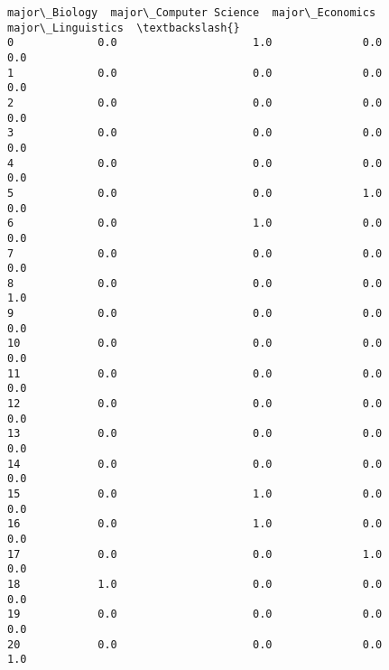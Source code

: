 \documentclass[11pt]{article}
\begin{document}
\begin{tcolorbox}[breakable, size=fbox, boxrule=.5pt, pad at break*=1mm, opacityfill=0]
\begin{Verbatim}[commandchars=\\\{\}]
    major\_Biology  major\_Computer Science  major\_Economics  major\_Linguistics  \textbackslash{}
0             0.0                     1.0              0.0                0.0
1             0.0                     0.0              0.0                0.0
2             0.0                     0.0              0.0                0.0
3             0.0                     0.0              0.0                0.0
4             0.0                     0.0              0.0                0.0
5             0.0                     0.0              1.0                0.0
6             0.0                     1.0              0.0                0.0
7             0.0                     0.0              0.0                0.0
8             0.0                     0.0              0.0                1.0
9             0.0                     0.0              0.0                0.0
10            0.0                     0.0              0.0                0.0
11            0.0                     0.0              0.0                0.0
12            0.0                     0.0              0.0                0.0
13            0.0                     0.0              0.0                0.0
14            0.0                     0.0              0.0                0.0
15            0.0                     1.0              0.0                0.0
16            0.0                     1.0              0.0                0.0
17            0.0                     0.0              1.0                0.0
18            1.0                     0.0              0.0                0.0
19            0.0                     0.0              0.0                0.0
20            0.0                     0.0              0.0                1.0


\end{Verbatim}
\end{tcolorbox}
\end{document}
